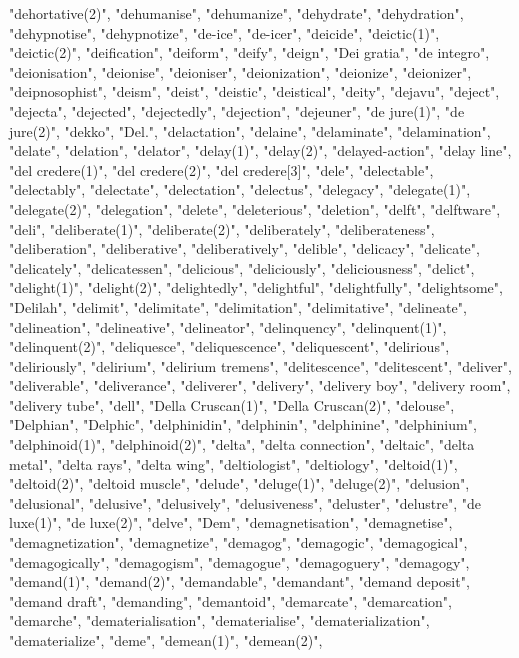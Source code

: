 "dehortative(2)",
"dehumanise",
"dehumanize",
"dehydrate",
"dehydration",
"dehypnotise",
"dehypnotize",
"de-ice",
"de-icer",
"deicide",
"deictic(1)",
"deictic(2)",
"deification",
"deiform",
"deify",
"deign",
"Dei gratia",
"de integro",
"deionisation",
"deionise",
"deioniser",
"deionization",
"deionize",
"deionizer",
"deipnosophist",
"deism",
"deist",
"deistic",
"deistical",
"deity",
"dejavu",
"deject",
"dejecta",
"dejected",
"dejectedly",
"dejection",
"dejeuner",
"de jure(1)",
"de jure(2)",
"dekko",
"Del.",
"delactation",
"delaine",
"delaminate",
"delamination",
"delate",
"delation",
"delator",
"delay(1)",
"delay(2)",
"delayed-action",
"delay line",
"del credere(1)",
"del credere(2)",
"del credere[3]",
"dele",
"delectable",
"delectably",
"delectate",
"delectation",
"delectus",
"delegacy",
"delegate(1)",
"delegate(2)",
"delegation",
"delete",
"deleterious",
"deletion",
"delft",
"delftware",
"deli",
"deliberate(1)",
"deliberate(2)",
"deliberately",
"deliberateness",
"deliberation",
"deliberative",
"deliberatively",
"delible",
"delicacy",
"delicate",
"delicately",
"delicatessen",
"delicious",
"deliciously",
"deliciousness",
"delict",
"delight(1)",
"delight(2)",
"delightedly",
"delightful",
"delightfully",
"delightsome",
"Delilah",
"delimit",
"delimitate",
"delimitation",
"delimitative",
"delineate",
"delineation",
"delineative",
"delineator",
"delinquency",
"delinquent(1)",
"delinquent(2)",
"deliquesce",
"deliquescence",
"deliquescent",
"delirious",
"deliriously",
"delirium",
"delirium tremens",
"delitescence",
"delitescent",
"deliver",
"deliverable",
"deliverance",
"deliverer",
"delivery",
"delivery boy",
"delivery room",
"delivery tube",
"dell",
"Della Cruscan(1)",
"Della Cruscan(2)",
"delouse",
"Delphian",
"Delphic",
"delphinidin",
"delphinin",
"delphinine",
"delphinium",
"delphinoid(1)",
"delphinoid(2)",
"delta",
"delta connection",
"deltaic",
"delta metal",
"delta rays",
"delta wing",
"deltiologist",
"deltiology",
"deltoid(1)",
"deltoid(2)",
"deltoid muscle",
"delude",
"deluge(1)",
"deluge(2)",
"delusion",
"delusional",
"delusive",
"delusively",
"delusiveness",
"deluster",
"delustre",
"de luxe(1)",
"de luxe(2)",
"delve",
"Dem",
"demagnetisation",
"demagnetise",
"demagnetization",
"demagnetize",
"demagog",
"demagogic",
"demagogical",
"demagogically",
"demagogism",
"demagogue",
"demagoguery",
"demagogy",
"demand(1)",
"demand(2)",
"demandable",
"demandant",
"demand deposit",
"demand draft",
"demanding",
"demantoid",
"demarcate",
"demarcation",
"demarche",
"dematerialisation",
"dematerialise",
"dematerialization",
"dematerialize",
"deme",
"demean(1)",
"demean(2)",
